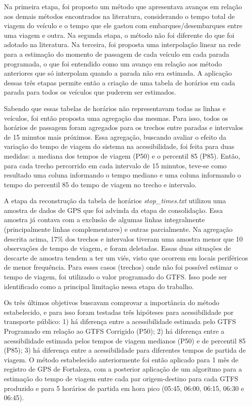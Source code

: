 \documentclass[        
    a4paper,          %
    12pt,             %
    chapter=TITLE,    %
    section=Title,    %
    subsection=Title, %
    oneside,          %
    english,          %
    spanish,          %
    brazil,           %
    fleqn             %
]{abntex2}
\begin{document}
  Na primeira etapa, foi proposto um método que apresentava avanços em relação aos demais métodos encontrados na literatura, considerando o tempo total de viagem do veículo e o tempo que ele gastou com embarques/desembarques entre uma viagem e outra. Na segunda etapa, o método não foi diferente do que foi adotado na literatura. Na terceira, foi proposta uma interpolação linear na rede para a estimação do momento de passagem de cada veículo em cada parada programada, o que foi entendido como um avanço em relação aos método anteriores que só interpolam quando a parada não era estimada. A aplicação dessas três etapas permite então a criação de uma tabela de horários em cada parada para todos os veículos que puderem ser estimados.
  
  Sabendo que essas tabelas de horários não representavam todas as linhas e veículos, foi então proposta uma agregação das mesmas. Para isso, todos os horários de passagem foram agregados para os trechos entre paradas e intervalos de 15 minutos mais próximos. Essa agregação, buscando avaliar o efeito da variação do tempo de viagem do sistema na acessibilidade, foi feita para duas medidas: a mediana dos tempos de viagem (P50) e o percentil 85 (P85). Então, para cada trecho percorrido em cada intervalo de 15 minutos, teve-se como resultado uma coluna informando o tempo mediano e uma coluna informando o tempo do percentil 85 do tempo de viagem no trecho e intervalo.
  
  A etapa da reconstrução da tabela de horários \emph{stop\_times.txt} utilizou uma amostra de dados de GPS que foi advinda da etapa de consolidação. Essa amostra já contava com a exclusão de algumas linhas integralmente (principalmente linhas complementares) e outras parcialmente. Na agregação descrita acima, 17\% dos trechos e intervalos tiveram uma amostra menor que 10 observações de tempo de viagem, e foram deletadas. Essas duas situações de descarte de amostra tendem a ter um viés, visto que ocorrem em locais periféricos de menor frequência. Para esses casos (trechos) onde não foi possível estimar o tempo de viagem, foi utilizado o valor programado do GTFS. Isso pode ser identificado como a principal limitação nessa etapa do trabalho.
  
  Os três últimos objetivos buscavam comprovar a importância do método estabelecido, e para isso foram testadas três hipóteses para acessibilidade por transporte público: 1) há diferença entre a acessibilidade estimada pelo GTFS Programado em relação ao GTFS Corrigido (P50); 2) há diferença entre a acessibilidade estimada pelos tempos de viagem medianos (P50) e de percentil 85 (P85); 3) há diferença entre a acessibilidade para diferentes tempos de partida de viagem. O método estabelecido anteriormente foi então aplicado para 1 mês de registro de GPS de Fortaleza, com a posterior aplicação de um algoritmo para a estimação do tempo de viagem entre cada par origem-destino para cada GTFS produzido e para 5 horários de partida em hora pico (05:45, 06:00, 06:15, 06:30 e 06:45).
  
\end{document}
